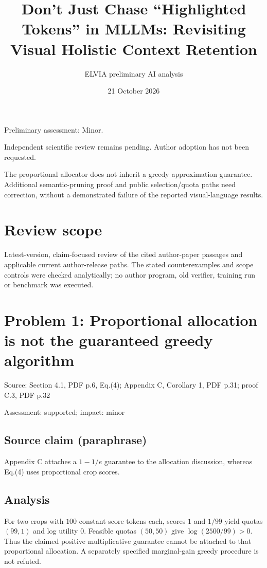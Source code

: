 \documentclass[11pt]{article}
\begin{document}
\title{Don’t Just Chase “Highlighted Tokens” in MLLMs: Revisiting Visual Holistic Context Retention}

\author{ELVIA preliminary AI analysis}\date{21 October 2026}\maketitle

Preliminary assessment: Minor.\par

Independent scientific review remains pending. Author adoption has not been requested.

The proportional allocator does not inherit a greedy approximation guarantee. Additional semantic-pruning proof and public selection/quota paths need correction, without a demonstrated failure of the reported visual-language results.

\section*{Review scope}

Latest-version, claim-focused review of the cited author-paper passages and applicable current author-release paths. The stated counterexamples and scope controls were checked analytically; no author program, old verifier, training run or benchmark was executed.

\section*{Problem 1: Proportional allocation is not the guaranteed greedy algorithm}

Source: Section 4.1, PDF p.6, Eq.(4); Appendix C, Corollary 1, PDF p.31; proof C.3, PDF p.32

Assessment: supported; impact: minor

\subsection*{Source claim (paraphrase)}

Appendix C attaches a \(1-1/e\) guarantee to the allocation discussion, whereas Eq.(4) uses proportional crop scores.

\subsection*{Analysis}

For two crops with \(100\) constant-score tokens each, scores \(1\) and \(1/99\) yield quotas \((99,1)\) and log utility \(0\). Feasible quotas \((50,50)\) give \(\log(2500/99)>0\). Thus the claimed positive multiplicative guarantee cannot be attached to that proportional allocation. A separately specified marginal-gain greedy procedure is not refuted.
\end{document}
